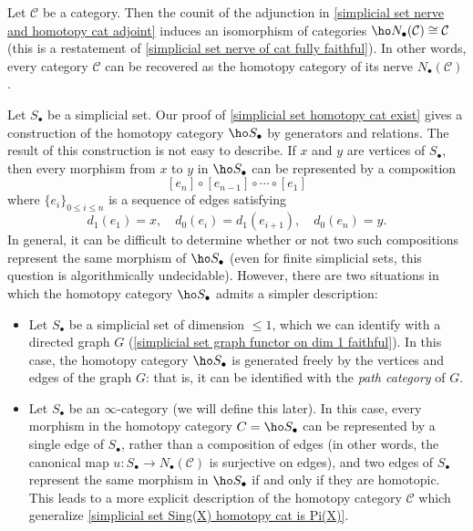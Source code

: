 \begin{remark}
Let $\mathcal{C}$ be a category. Then the counit of the adjunction in \cref{simplicial set nerve and homotopy cat adjoint} induces an isomorphism of categories $\ho N_\bullet(\mathcal{C})\cong\mathcal{C}$ (this is a restatement of \cref{simplicial set nerve of cat fully faithful}). In other words, every category $\mathcal{C}$ can be recovered as the homotopy category of its nerve $N_\bullet(\mathcal{C})$.
\end{remark}
\begin{remark}
Let $S_\bullet$ be a simplicial set. Our proof of \cref{simplicial set homotopy cat exist} gives a construction of the homotopy category $\ho S_\bullet$ by generators and relations. The result of this construction is not easy to describe. If $x$ and $y$ are vertices of $S_\bullet$, then every morphism from $x$ to $y$ in $\ho S_\bullet$ can be represented by a composition
\[[e_n]\circ[e_{n-1}]\circ\cdots\circ[e_1]\]
where $\{e_i\}_{0\leq i\leq n}$ is a sequence of edges satisfying
\[d_1(e_1)=x,\quad d_0(e_i)=d_1(e_{i+1}),\quad d_0(e_n)=y.\]
In general, it can be difficult to determine whether or not two such compositions represent the same morphism of $\ho S_\bullet$ (even for finite simplicial sets, this question is algorithmically undecidable). However, there are two situations in which the homotopy category $\ho S_\bullet$ admits a simpler description:
\begin{itemize}
\item Let $S_\bullet$ be a simplicial set of dimension $\leq 1$, which we can identify with a directed graph $G$ (\cref{simplicial set graph functor on dim 1 faithful}). In this case, the homotopy category $\ho S_\bullet$ is generated freely by the vertices and edges of the graph $G$: that is, it can be identified with the \textit{path category} of $G$.
\item Let $S_\bullet$ be an $\infty$-category (we will define this later). In this case, every morphism in the homotopy category $C=\ho S_\bullet$ can be represented by a single edge of $S_\bullet$, rather than a composition of edges (in other words, the canonical map $u:S_\bullet\to N_\bullet(\mathcal{C})$ is surjective on edges), and two edges of $S_\bullet$ represent the same morphism in $\ho S_\bullet$ if and only if they are homotopic. This leads to a more explicit description of the homotopy category $\mathcal{C}$ which generalize \cref{simplicial set Sing(X) homotopy cat is Pi(X)}.
\end{itemize}
\end{remark}
